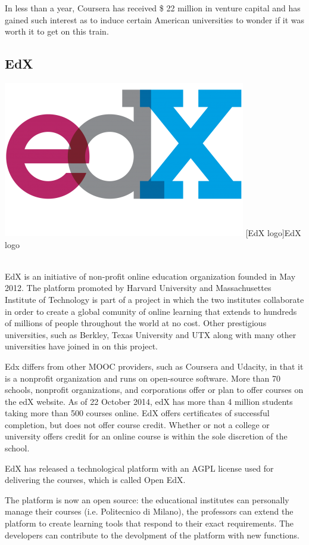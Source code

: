 In less than a year, Coursera has received \$ 22 million in venture capital and has gained such interest as to induce certain American universities to wonder if it was worth it to get on this train.

\subsection{EdX}
\label{subsec:EdX}
  \begin{minipage}{\linewidth}
      \centering
      \includegraphics[width=0.3\linewidth]{images/chapter1/edx_logo.png}
      [EdX logo]{EdX logo}
  \end{minipage}
\\

EdX is an initiative of non-profit online education organization founded in May 2012. The platform promoted by Harvard University and Massachusettes Institute of Technology is part of a project in which the two institutes collaborate in order to create a global comunity of online learning that extends to hundreds of millions of people throughout the world at no cost. Other prestigious universities, such as Berkley, Texas University and UTX along with many other universities have joined in on this project.

Edx differs from other MOOC providers, such as Coursera and Udacity, in that it is a nonprofit organization and runs on open-source software.\cite{mooc_edx}
More than 70 schools, nonprofit organizations, and corporations offer or plan to offer courses on the edX website.
As of 22 October 2014, edX has more than 4 million students taking more than 500 courses online.\cite{mooc_edx}
EdX offers certificates of successful completion, but does not offer course credit. Whether or not a college or university offers credit for an online course is within the sole discretion of the school.\cite{mooc_edx}

EdX has released a technological platform with an AGPL license used for delivering the courses, which is called Open EdX.

The platform is now an open source: the educational institutes can personally manage their courses (i.e. Politecnico di Milano), the professors can extend the platform to create learning tools that respond to their exact requirements. The developers can contribute to the devolpment of the platform with new functions.

